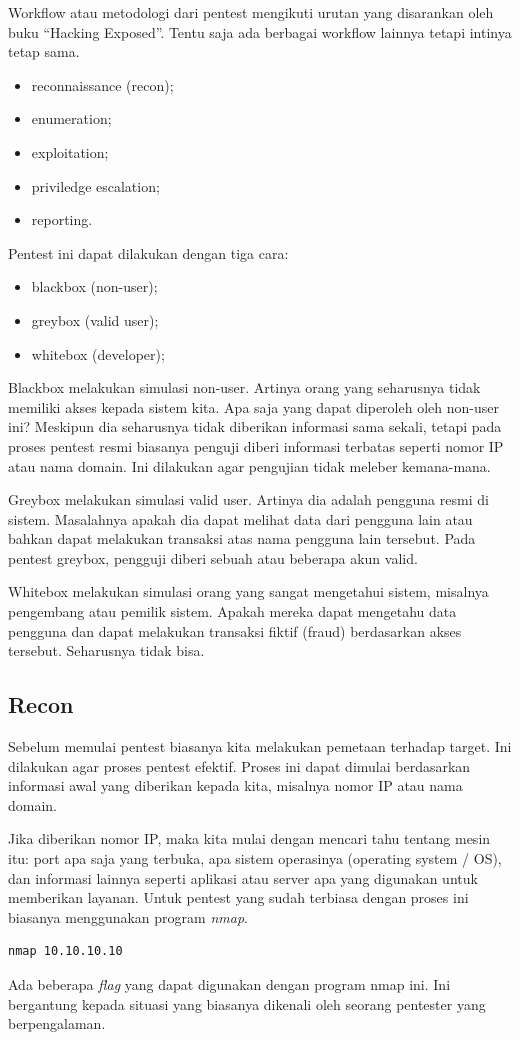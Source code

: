 Workflow atau metodologi dari pentest mengikuti urutan yang disarankan 
oleh buku ``Hacking Exposed''. Tentu saja ada berbagai workflow lainnya
tetapi intinya tetap sama.

\begin{itemize}
\item reconnaissance (recon);
\item enumeration;
\item exploitation;
\item priviledge escalation;
\item reporting.
\end{itemize}

Pentest ini dapat dilakukan dengan tiga cara:
\begin{itemize}
\item blackbox (non-user);
\item greybox (valid user);
\item whitebox (developer);
\end{itemize}

Blackbox melakukan simulasi non-user. Artinya orang yang seharusnya tidak
memiliki akses kepada sistem kita. Apa saja yang dapat diperoleh oleh
non-user ini?
Meskipun dia seharusnya tidak diberikan informasi sama sekali, tetapi
pada proses pentest resmi biasanya penguji diberi informasi terbatas
seperti nomor IP atau nama domain. Ini dilakukan agar pengujian tidak
meleber kemana-mana.

Greybox melakukan simulasi valid user. Artinya dia adalah pengguna resmi di
sistem. Masalahnya apakah dia dapat melihat data dari pengguna lain
atau bahkan dapat melakukan transaksi atas nama pengguna lain tersebut.
Pada pentest greybox, pengguji diberi sebuah atau beberapa akun valid.

Whitebox melakukan simulasi orang yang sangat mengetahui sistem, misalnya
pengembang atau pemilik sistem. Apakah mereka dapat mengetahu data pengguna
dan dapat melakukan transaksi fiktif (fraud) berdasarkan akses tersebut.
Seharusnya tidak bisa.

\subsection{Recon}
Sebelum memulai pentest biasanya kita melakukan pemetaan terhadap target.
Ini dilakukan agar proses pentest efektif.
Proses ini dapat dimulai berdasarkan informasi awal yang diberikan kepada
kita, misalnya nomor IP atau nama domain.

Jika diberikan nomor IP, maka kita mulai dengan mencari tahu tentang
mesin itu: port apa saja yang terbuka, apa sistem operasinya
(operating system / OS), dan informasi lainnya seperti aplikasi atau
server apa yang digunakan untuk memberikan layanan.
Untuk pentest yang sudah terbiasa dengan proses ini biasanya menggunakan
program \emph{nmap}.
\begin{verbatim}
nmap 10.10.10.10
\end{verbatim}
Ada beberapa \emph{flag} yang dapat digunakan dengan program nmap ini.
Ini bergantung kepada situasi yang biasanya dikenali oleh seorang
pentester yang berpengalaman.

